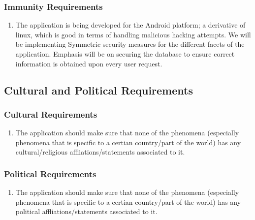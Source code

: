 \documentclass[]{article}
\begin{document}
\subsubsection{Immunity Requirements}
\label{ssub:immunity_requirements}
\begin{enumerate}[{SR}5. ]
	\item The application is being developed for the Android platform; a derivative of linux, which is good in terms of handling malicious hacking attempts. We will be implementing Symmetric security measures for the different facets of the application. Emphasis will be on securing the database to ensure correct information is obtained upon every user request.
\end{enumerate}


\subsection{Cultural and Political Requirements}
\label{sub:cultural_and_political_requirements}

\subsubsection{Cultural Requirements}
\label{ssub:cultural_requirements}
\begin{enumerate}[{CP}1. ]
	\item The application should make sure that none of the phenomena (especially phenomena that is specific to a certian country/part of the world) has any cultural/religious affliations/statements associated to it.
\end{enumerate}

\subsubsection{Political Requirements}
\label{ssub:political_requirements}
\begin{enumerate}[{CP}2. ]
	\item The application should make sure that none of the phenomena (especially phenomena that is specific to a certian country/part of the world) has any political affliations/statements associated to it.
\end{enumerate}

\end{document}
